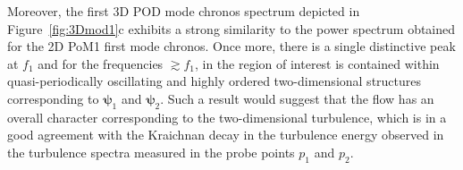 {%

{Moreover, the first 3D POD mode chronos  spectrum depicted in Figure~\ref{fig:3Dmod1}c exhibits a strong similarity to the power spectrum obtained for the 2D PoM1 first mode chronos. Once more, there is a single distinctive peak at $f_{1}$ and for the frequencies $\gtrsim f_{1}$,  in the region of interest is contained within quasi-periodically oscillating and highly ordered two-dimensional structures corresponding to $\bm{\psi}_{1}$ and $\bm{\psi}_{2}$. Such a result would suggest that the flow has an overall character corresponding to the two-dimensional turbulence, which is in a good agreement with the  Kraichnan decay in the turbulence energy observed in the turbulence spectra measured in the probe points $p_{1}$ and $p_{2}$.



}}
